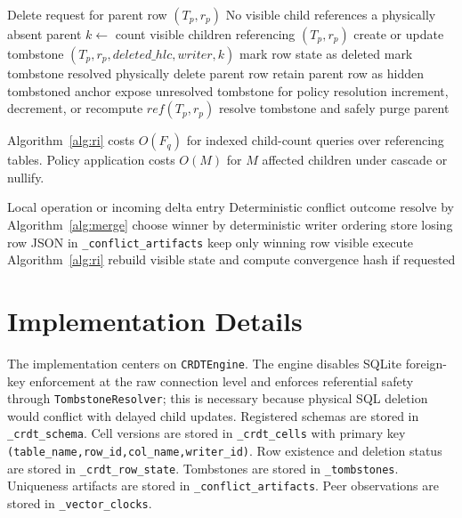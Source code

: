\documentclass[pdflatex,sn-mathphys-num]{sn-jnl}
\begin{document}
\begin{algorithm}[t]
\caption{Referential Integrity Preservation Procedure}
\label{alg:ri}
\begin{algorithmic}[1]
\Require Delete request for parent row $(T_p,r_p)$
\Ensure No visible child references a physically absent parent
\State $k \gets$ count visible children referencing $(T_p,r_p)$
\State create or update tombstone $(T_p,r_p,deleted\_hlc,writer,k)$
\State mark row state as deleted
  \State mark tombstone resolved
  \State physically delete parent row
\Else
  \State retain parent row as hidden tombstoned anchor
  \State expose unresolved tombstone for policy resolution
\EndIf
{}
  \State increment, decrement, or recompute $ref(T_p,r_p)$
    \State resolve tombstone and safely purge parent
  \EndIf
\EndFor
\end{algorithmic}
\end{algorithm}

Algorithm~\ref{alg:ri} costs $O(F_q)$ for indexed child-count queries over referencing tables. Policy application costs $O(M)$ for $M$ affected children under cascade or nullify.

\begin{algorithm}[t]
\caption{Conflict Detection and Resolution Workflow}
\label{alg:conflict}
\begin{algorithmic}[1]
\Require Local operation or incoming delta entry
\Ensure Deterministic conflict outcome
  \State resolve by Algorithm~\ref{alg:merge}
\EndIf
{}
  \State choose winner by deterministic writer ordering
  \State store losing row JSON in \texttt{\_conflict\_artifacts}
  \State keep only winning row visible
\EndIf
{}
  \State execute Algorithm~\ref{alg:ri}
\EndIf
\State rebuild visible state and compute convergence hash if requested
\end{algorithmic}
\end{algorithm}

\section{Implementation Details}

The implementation centers on \texttt{CRDTEngine}. The engine disables SQLite foreign-key enforcement at the raw connection level and enforces referential safety through \texttt{TombstoneResolver}; this is necessary because physical SQL deletion would conflict with delayed child updates. Registered schemas are stored in \texttt{\_crdt\_schema}. Cell versions are stored in \texttt{\_crdt\_cells} with primary key \texttt{(table\_name,row\_id,col\_name,writer\_id)}. Row existence and deletion status are stored in \texttt{\_crdt\_row\_state}. Tombstones are stored in \texttt{\_tombstones}. Uniqueness artifacts are stored in \texttt{\_conflict\_artifacts}. Peer observations are stored in \texttt{\_vector\_clocks}.
\end{document}
